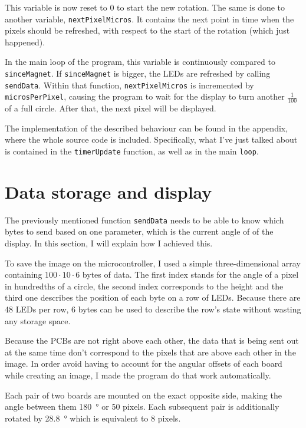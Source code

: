 \documentclass[a4paper, 11pt, titlepage]{report}
\begin{document}
This variable is now reset to 0 to start the new rotation. The same is done to another
variable, \texttt{nextPixelMicros}. It contains the next point in time when the pixels
should be refreshed, with respect to the start of the rotation (which just happened).

In the main loop of the program, this variable is continuously compared to \texttt{sinceMagnet}.
If \texttt{sinceMagnet} is bigger, the LEDs are refreshed by calling \texttt{sendData}. Within
that function, \texttt{nextPixelMicros} is incremented by \texttt{microsPerPixel}, causing the
program to wait for the display to turn another $\frac{1}{100}$ of a full circle. After that, the
next pixel will be displayed.

The implementation of the described behaviour can be found in the appendix, where the whole source
code is included. Specifically, what I've just talked about is contained in the
\texttt{timerUpdate} function, as well as in the main \texttt{loop}.


\section{Data storage and display}

The previously mentioned function \texttt{sendData} needs to be able to know which bytes to send
based on one parameter, which is the current angle of of the display. In this section, I will
explain how I achieved this.

To save the image on the microcontroller, I used a simple three-dimensional array containing $100
\cdot 10 \cdot 6$ bytes of data. The first index stands for the angle of a pixel in hundredths of
a circle, the second index corresponds to the height and the third one describes the position of
each byte on a row of LEDs. Because there are 48 LEDs per row, 6 bytes can be used to describe the
row's state without wasting any storage space.

Because the PCBs are not right above each other, the data that is being sent out at the same time
don't correspond to the pixels that are above each other in the image. In order avoid having to
account for the angular offsets of each board while creating an image, I made the program do that
work automatically.

Each pair of two boards are mounted on the exact opposite side, making the angle between them
\SI{180}{\degree} or 50 pixels. Each subsequent pair is additionally rotated by \SI{28.8}{\degree}
which is equivalent to 8 pixels.
\end{document}
